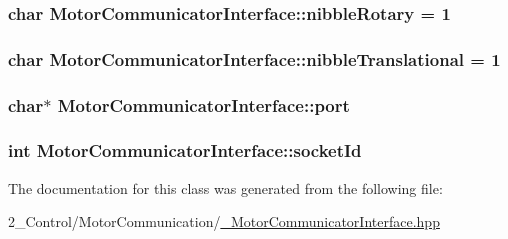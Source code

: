 \subsubsection[{\texorpdfstring{nibble\+Rotary}{nibbleRotary}}]{\setlength{\rightskip}{0pt plus 5cm}char Motor\+Communicator\+Interface\+::nibble\+Rotary = 1\hspace{0.3cm}{\ttfamily [protected]}}\hypertarget{class_motor_communicator_interface_af57ae9b19b30f4e7fc07545629117ad9}{}\label{class_motor_communicator_interface_af57ae9b19b30f4e7fc07545629117ad9}
\subsubsection[{\texorpdfstring{nibble\+Translational}{nibbleTranslational}}]{\setlength{\rightskip}{0pt plus 5cm}char Motor\+Communicator\+Interface\+::nibble\+Translational = 1\hspace{0.3cm}{\ttfamily [protected]}}\hypertarget{class_motor_communicator_interface_ae3010f217b379f0f62ebd5fee8387f21}{}\label{class_motor_communicator_interface_ae3010f217b379f0f62ebd5fee8387f21}
\subsubsection[{\texorpdfstring{port}{port}}]{\setlength{\rightskip}{0pt plus 5cm}char$\ast$ Motor\+Communicator\+Interface\+::port\hspace{0.3cm}{\ttfamily [protected]}}\hypertarget{class_motor_communicator_interface_adde2a840f8e9cd2e43b34af2bf8c3719}{}\label{class_motor_communicator_interface_adde2a840f8e9cd2e43b34af2bf8c3719}
\subsubsection[{\texorpdfstring{socket\+Id}{socketId}}]{\setlength{\rightskip}{0pt plus 5cm}int Motor\+Communicator\+Interface\+::socket\+Id\hspace{0.3cm}{\ttfamily [protected]}}\hypertarget{class_motor_communicator_interface_ad4d2f463fa6182b86bee4852dcee3d3a}{}\label{class_motor_communicator_interface_ad4d2f463fa6182b86bee4852dcee3d3a}


The documentation for this class was generated from the following file\+:\begin{DoxyCompactItemize}
\item 
2\+\_\+\+Control/\+Motor\+Communication/\hyperlink{___motor_communicator_interface_8hpp}{\+\_\+\+Motor\+Communicator\+Interface.\+hpp}\end{DoxyCompactItemize}
